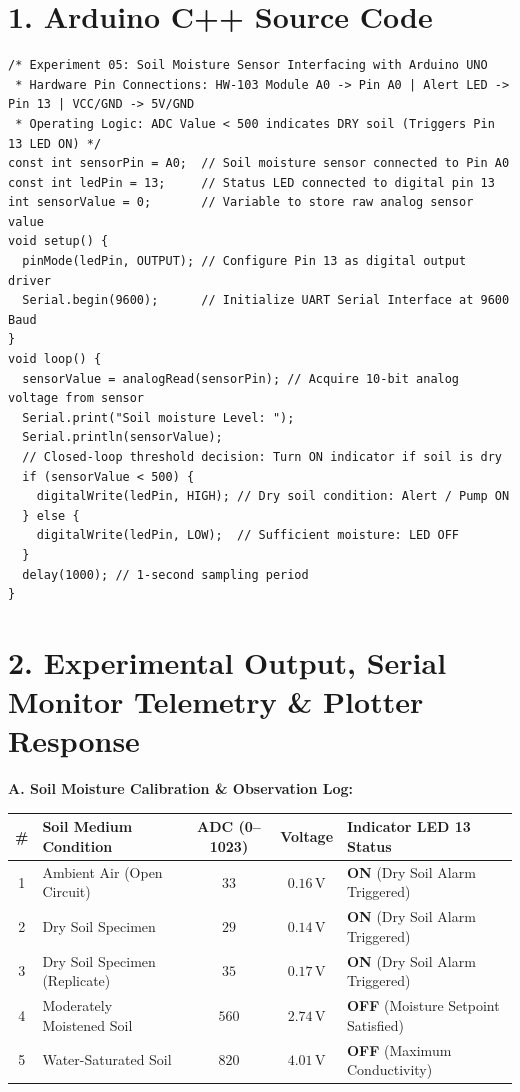\documentclass[10pt,a4paper]{article}
\begin{document}
\section*{1. Arduino C++ Source Code}
\begin{lstlisting}[style=bwCode, title={\textbf{Listing 5.1: Microcontroller Firmware for Soil Moisture Telemetry and Threshold Actuation.}}]
/* Experiment 05: Soil Moisture Sensor Interfacing with Arduino UNO
 * Hardware Pin Connections: HW-103 Module A0 -> Pin A0 | Alert LED -> Pin 13 | VCC/GND -> 5V/GND
 * Operating Logic: ADC Value < 500 indicates DRY soil (Triggers Pin 13 LED ON) */
const int sensorPin = A0;  // Soil moisture sensor connected to Pin A0
const int ledPin = 13;     // Status LED connected to digital pin 13
int sensorValue = 0;       // Variable to store raw analog sensor value
void setup() {
  pinMode(ledPin, OUTPUT); // Configure Pin 13 as digital output driver
  Serial.begin(9600);      // Initialize UART Serial Interface at 9600 Baud
}
void loop() {
  sensorValue = analogRead(sensorPin); // Acquire 10-bit analog voltage from sensor
  Serial.print("Soil moisture Level: ");
  Serial.println(sensorValue);
  // Closed-loop threshold decision: Turn ON indicator if soil is dry
  if (sensorValue < 500) {
    digitalWrite(ledPin, HIGH); // Dry soil condition: Alert / Pump ON
  } else {
    digitalWrite(ledPin, LOW);  // Sufficient moisture: LED OFF
  }
  delay(1000); // 1-second sampling period
}
\end{lstlisting}

\vspace{0.04cm}
\section*{2. Experimental Output, Serial Monitor Telemetry \& Plotter Response}

\noindent
\textbf{A. Soil Moisture Calibration \& Observation Log:}\par\vspace{0.06cm}
{\footnotesize
\setlength{\tabcolsep}{4.2pt}
\renewcommand{\arraystretch}{1.18}
\begin{tabularx}{\textwidth}{|c|p{4.8cm}|c|c|X|}
\hline
\textbf{\#} & \textbf{Soil Medium Condition} & \textbf{ADC (0--1023)} & \textbf{Voltage} & \textbf{Indicator LED 13 Status} \\
\hline
1 & Ambient Air (Open Circuit) & $33$ & $0.16\,\text{V}$ & \textbf{ON} (Dry Soil Alarm Triggered) \\
2 & Dry Soil Specimen & $29$ & $0.14\,\text{V}$ & \textbf{ON} (Dry Soil Alarm Triggered) \\
3 & Dry Soil Specimen (Replicate) & $35$ & $0.17\,\text{V}$ & \textbf{ON} (Dry Soil Alarm Triggered) \\
4 & Moderately Moistened Soil & $560$ & $2.74\,\text{V}$ & \textbf{OFF} (Moisture Setpoint Satisfied) \\
5 & Water-Saturated Soil & $820$ & $4.01\,\text{V}$ & \textbf{OFF} (Maximum Conductivity) \\
\hline
\end{tabularx}
}
\end{document}
